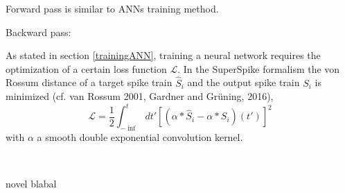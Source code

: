 Forward pass is similar to ANNs training method.

Backward pass:

As stated in section \ref{trainingANN}, training a neural network requires the optimization of a certain loss function $\mathcal{L}$. In the SuperSpike formalism the von Rossum distance of a target spike train $\hat{S}_i$ and the output spike train $S_i$ is minimized (cf. van Rossum 2001, Gardner and Grüning, 2016),
\begin{equation}
\mathcal{L} = \frac{1}{2} \int^t_{-\inf}dt' \left[\left(\alpha \ast \hat{S}_i - \alpha \ast S_i \right)(t')\right]^2
\end{equation}
with $\alpha$ a smooth double exponential convolution kernel.

\

novel blabal


%
